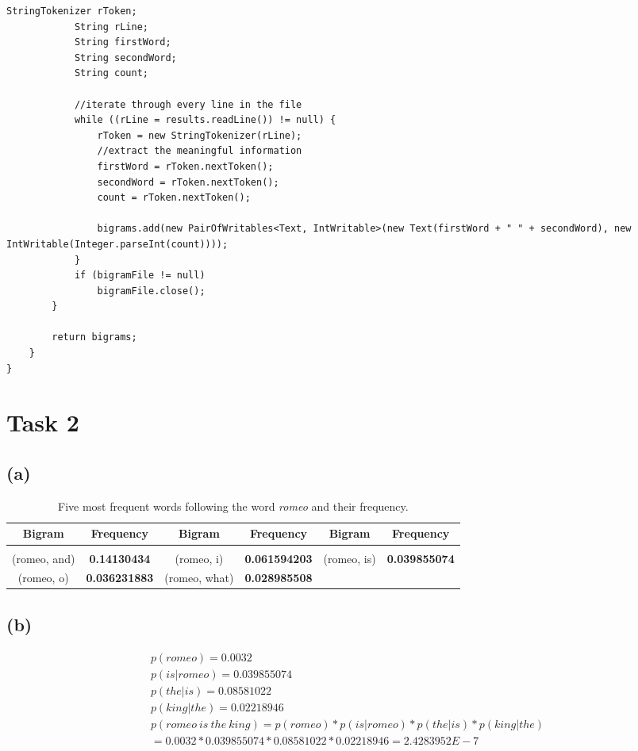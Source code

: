 \documentclass{article} %
\begin{document}
\begin{lstlisting}[style=Java]
			StringTokenizer rToken;
			String rLine;
			String firstWord;
			String secondWord;
			String count;

			//iterate through every line in the file
			while ((rLine = results.readLine()) != null) {
				rToken = new StringTokenizer(rLine);
				//extract the meaningful information
				firstWord = rToken.nextToken();
				secondWord = rToken.nextToken();
				count = rToken.nextToken();

				bigrams.add(new PairOfWritables<Text, IntWritable>(new Text(firstWord + " " + secondWord), new IntWritable(Integer.parseInt(count))));
			}
			if (bigramFile != null)
				bigramFile.close();
		}

		return bigrams;
	}
}
\end{lstlisting}

\section*{Task 2}

\subsection*{(a)}

\begin{table}[!htbp]
\caption{Five most frequent words following the word \textit{romeo} and their frequency.}
\label{table:3}
\begin{center}
\begin{tabular}{c c c c c c}
\multicolumn{1}{c}{\bf Bigram} & \multicolumn{1}{c}{\bf Frequency} & \multicolumn{1}{c}{\bf Bigram} & \multicolumn{1}{c}{\bf Frequency} &
\multicolumn{1}{c}{\bf Bigram} & \multicolumn{1}{c}{\bf Frequency}
\\ \hline \\
(romeo, and) & \textbf{0.14130434} & (romeo, i) & \textbf{0.061594203} & (romeo, is) & \textbf{0.039855074}\\
(romeo, o) & \textbf{0.036231883} & (romeo, what) & \textbf{0.028985508} & {} & {}\\

\end{tabular}
\end{center}
\end{table}

\subsection*{(b)}

\begin{gather*}
p(romeo) = 0.0032\\
p(is|romeo) = 0.039855074\\
p(the|is) = 0.08581022\\
p(king|the) = 0.02218946\\
p(romeo\ is\ the\ king) = p(romeo) * p(is|romeo) * p(the|is) * p(king|the)\\ = 0.0032 * 0.039855074 * 0.08581022 * 0.02218946 = 2.4283952E-7
\end{gather*}
\end{document}
